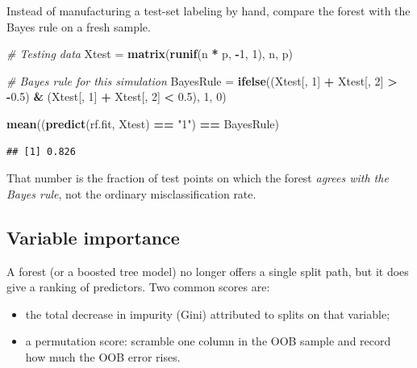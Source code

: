 \documentclass[
]{book}
\newenvironment{Shaded}{\begin{snugshade}}{\end{snugshade}}
\newcommand{\CommentTok}[1]{\textcolor[rgb]{0.56,0.35,0.01}{\textit{#1}}}
\newcommand{\DecValTok}[1]{\textcolor[rgb]{0.00,0.00,0.81}{#1}}
\newcommand{\FloatTok}[1]{\textcolor[rgb]{0.00,0.00,0.81}{#1}}
\newcommand{\FunctionTok}[1]{\textcolor[rgb]{0.13,0.29,0.53}{\textbf{#1}}}
\newcommand{\NormalTok}[1]{#1}
\newcommand{\OtherTok}[1]{\textcolor[rgb]{0.56,0.35,0.01}{#1}}
\newcommand{\SpecialCharTok}[1]{\textcolor[rgb]{0.81,0.36,0.00}{\textbf{#1}}}
\newcommand{\StringTok}[1]{\textcolor[rgb]{0.31,0.60,0.02}{#1}}
\providecommand{\tightlist}{%
  \setlength{\itemsep}{0pt}\setlength{\parskip}{0pt}}
\begin{document}
Instead of manufacturing a test-set labeling by hand, compare the forest with the Bayes rule on a fresh sample.

\begin{Shaded}
\begin{Highlighting}[]
\CommentTok{\# Testing data}
\NormalTok{Xtest }\OtherTok{=} \FunctionTok{matrix}\NormalTok{(}\FunctionTok{runif}\NormalTok{(n }\SpecialCharTok{*}\NormalTok{ p, }\SpecialCharTok{{-}}\DecValTok{1}\NormalTok{, }\DecValTok{1}\NormalTok{), n, p)}

\CommentTok{\# Bayes rule for this simulation}
\NormalTok{BayesRule }\OtherTok{=} \FunctionTok{ifelse}\NormalTok{((Xtest[, }\DecValTok{1}\NormalTok{] }\SpecialCharTok{+}\NormalTok{ Xtest[, }\DecValTok{2}\NormalTok{] }\SpecialCharTok{\textgreater{}} \SpecialCharTok{{-}}\FloatTok{0.5}\NormalTok{) }\SpecialCharTok{\&}\NormalTok{ (Xtest[,}
    \DecValTok{1}\NormalTok{] }\SpecialCharTok{+}\NormalTok{ Xtest[, }\DecValTok{2}\NormalTok{] }\SpecialCharTok{\textless{}} \FloatTok{0.5}\NormalTok{), }\DecValTok{1}\NormalTok{, }\DecValTok{0}\NormalTok{)}

\FunctionTok{mean}\NormalTok{((}\FunctionTok{predict}\NormalTok{(rf.fit, Xtest) }\SpecialCharTok{==} \StringTok{"1"}\NormalTok{) }\SpecialCharTok{==}\NormalTok{ BayesRule)}
\end{Highlighting}
\end{Shaded}

\begin{verbatim}
## [1] 0.826
\end{verbatim}

That number is the fraction of test points on which the forest \emph{agrees with the Bayes rule}, not the ordinary misclassification rate.

\subsection*{Variable importance}\label{variable-importance-2}

A forest (or a boosted tree model) no longer offers a single split path, but it does give a ranking of predictors. Two common scores are:

\begin{itemize}
\tightlist
\item
  the total decrease in impurity (Gini) attributed to splits on that variable;
\item
  a permutation score: scramble one column in the OOB sample and record how much the OOB error rises.
\end{itemize}
\end{document}
